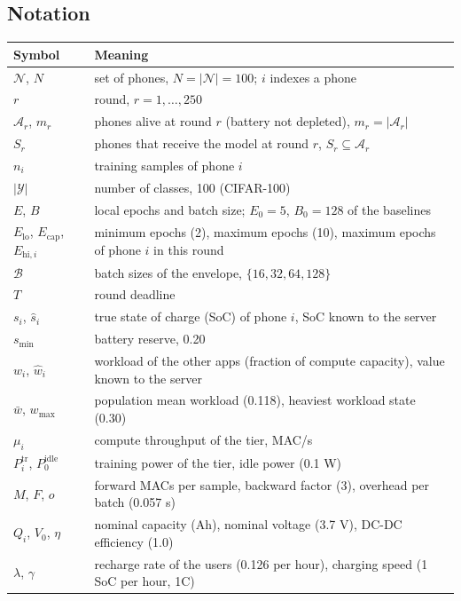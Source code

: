 \documentclass[11pt,a4paper]{article}
\begin{document}
\subsection*{Notation}

\begin{longtable}{p{}p{}}
\toprule
Symbol & Meaning \\
\midrule
\endhead
$\mathcal{N}$, $N$ & set of phones, $N = |\mathcal{N}| = 100$; $i$ indexes a phone \\
$r$ & round, $r = 1, \dots, 250$ \\
$\mathcal{A}_r$, $m_r$ & phones alive at round $r$ (battery not depleted), $m_r = |\mathcal{A}_r|$ \\
$S_r$ & phones that receive the model at round $r$, $S_r \subseteq \mathcal{A}_r$ \\
$n_i$ & training samples of phone $i$ \\
$|\mathcal{Y}|$ & number of classes, 100 (CIFAR-100) \\
$E$, $B$ & local epochs and batch size; $E_0 = 5$, $B_0 = 128$ of the baselines \\
$E_{\mathrm{lo}}$, $E_{\mathrm{cap}}$, $E_{\mathrm{hi},i}$ & minimum epochs (2), maximum epochs (10), maximum epochs of phone $i$ in this round \\
$\mathcal{B}$ & batch sizes of the envelope, $\{16, 32, 64, 128\}$ \\
$T$ & round deadline \\
$s_i$, $\hat{s}_i$ & true state of charge (SoC) of phone $i$, SoC known to the server \\
$s_{\min}$ & battery reserve, 0.20 \\
$w_i$, $\hat{w}_i$ & workload of the other apps (fraction of compute capacity), value known to the server \\
$\bar{w}$, $w_{\max}$ & population mean workload (0.118), heaviest workload state (0.30) \\
$\mu_i$ & compute throughput of the tier, MAC/s \\
$P^{\mathrm{tr}}_i$, $P^{\mathrm{idle}}_0$ & training power of the tier, idle power (0.1 W) \\
$M$, $F$, $o$ & forward MACs per sample, backward factor (3), overhead per batch (0.057 s) \\
$Q_i$, $V_0$, $\eta$ & nominal capacity (Ah), nominal voltage (3.7 V), DC-DC efficiency (1.0) \\
$\lambda$, $\gamma$ & recharge rate of the users (0.126 per hour), charging speed (1 SoC per hour, 1C) \\

\end{longtable}
\end{document}
